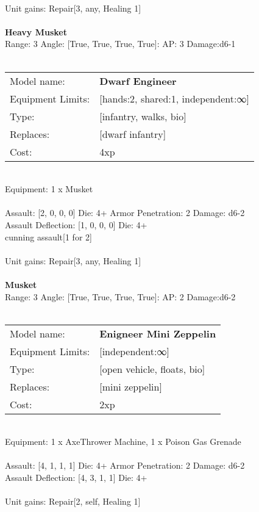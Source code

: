\ \\
Unit gains: Repair[3, any, Healing 1]\\ 

\ \\
{\bf Heavy Musket } \\



Range: 3  Angle: [True, True, True, True]: AP: 3 Damage:d6-1 \\




 
\ \\

\noindent
\begin{tabular}{ll}
Model name: &{\bf Dwarf Engineer } \\
Equipment Limits: &[hands:2, shared:1, independent:∞] \\
Type: &[infantry, walks, bio] \\
Replaces: &[dwarf infantry] \\
Cost: & 4xp\\
\end{tabular}
\ \\
Equipment: 1 x Musket \\
\ \\
Assault: [2, 0, 0, 0] Die: 4+ Armor Penetration: 2 Damage: d6-2 \\
Assault Deflection: [1, 0, 0, 0] Die: 4+\\
\indent cunning assault[1 for 2]\\ 
 
\ \\
Unit gains: Repair[3, any, Healing 1]\\ 

\ \\
{\bf Musket } \\



Range: 3  Angle: [True, True, True, True]: AP: 2 Damage:d6-2 \\




 
\ \\

\noindent
\begin{tabular}{ll}
Model name: &{\bf Enigneer Mini Zeppelin } \\
Equipment Limits: &[independent:∞] \\
Type: &[open vehicle, floats, bio] \\
Replaces: &[mini zeppelin] \\
Cost: & 2xp\\
\end{tabular}
\ \\
Equipment: 1 x AxeThrower Machine, 1 x Poison Gas Grenade \\
\ \\
Assault: [4, 1, 1, 1] Die: 4+ Armor Penetration: 2 Damage: d6-2 \\
Assault Deflection: [4, 3, 1, 1] Die: 4+\\
\indent  
\ \\
Unit gains: Repair[2, self, Healing 1]\\ 


